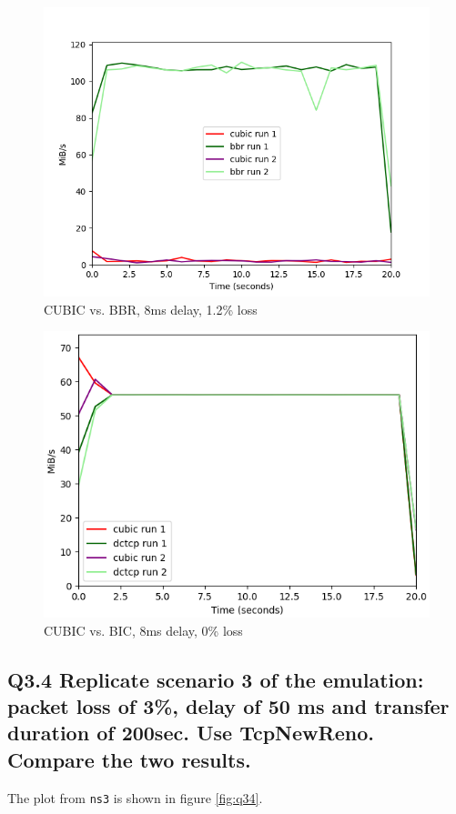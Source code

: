 \documentclass{article}
\begin{document}
\begin{figure}[H]
	\includegraphics{cubic_vs_bbr_8_12.png}
	\caption{CUBIC vs. BBR, 8ms delay, 1.2\% loss}
	\label{fig:cubic-bbr-8-12}
\end{figure}

\begin{figure}[H]
	\includegraphics[width=\textwidth]{cubic-bic-8-0.png}
	\caption{CUBIC vs. BIC, 8ms delay, 0\% loss}
	\label{fig:cubic-bic-8-0}
\end{figure}


\subsection{Q3.4 Replicate scenario 3 of the emulation: packet loss of 3\%, delay of 50 ms and transfer duration of 200sec. Use TcpNewReno. Compare the two results.}
The plot from \texttt{ns3} is shown in figure \ref{fig:q34}.
\end{document}
